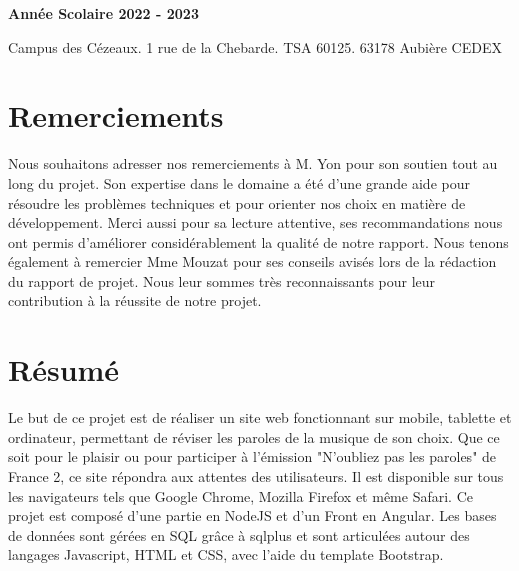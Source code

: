 \documentclass[12pt,french]{article}
\begin{document}
\begin{titlepage}
\begin{minipage}{.45\linewidth}
\begin{flushright}
  			\textbf{Année Scolaire 2022 - 2023}
  		\end{flushright} 
  	\end{minipage}
  	
  	\vspace*{2cm} 
  	
    Campus des Cézeaux. 1 rue de la Chebarde. TSA 60125. 63178 Aubière CEDEX
    	

\end{titlepage}

\restoregeometry


\newpage

\vspace*{1cm}

\section*{Remerciements}

Nous souhaitons adresser nos remerciements à M. Yon pour son soutien tout au long du projet.
Son expertise dans le domaine a été d'une grande aide pour résoudre les problèmes techniques et pour orienter nos choix en matière de développement.
Merci aussi pour sa lecture attentive, ses recommandations nous ont permis d'améliorer considérablement la qualité de notre rapport.
Nous tenons également à remercier Mme Mouzat pour ses conseils avisés lors de la rédaction du rapport de projet.
Nous leur sommes très reconnaissants pour leur contribution à la réussite de notre projet.



\renewcommand{\listfigurename}{Table des illustrations}
\listoffigures

\newpage

\vspace*{1cm}

\section*{Résumé}


Le but de ce projet est de réaliser un site web fonctionnant sur mobile, tablette et ordinateur, permettant de réviser les paroles de la musique de son choix. Que ce soit pour le plaisir ou pour participer à l'émission "N'oubliez pas les paroles" de France 2, ce site répondra aux attentes des utilisateurs. Il est disponible sur tous les navigateurs tels que Google Chrome, Mozilla Firefox et même Safari. Ce projet est composé d'une partie  en NodeJS et d'un \gls{Front} en Angular. Les bases de données sont gérées en \gls{SQL} grâce à sqlplus et sont articulées autour des langages \gls{Javascript}, \gls{HTML} et \gls{CSS}, avec l'aide du template Bootstrap.
\newline 
\end{document}

